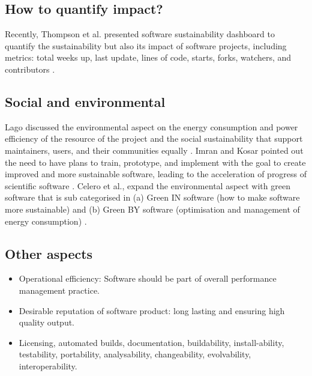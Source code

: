 \documentclass{article}
\begin{document}





\subsection{How to quantify impact?}
Recently, Thompson et al. presented software sustainability dashboard to quantify the sustainability but also its impact of software projects, including metrics: total weeks up, last update, lines of code, starts, forks, watchers, and contributors \cite{ozdemir_2023_8337480}.

\subsection{Social and environmental}
Lago discussed the environmental aspect on the energy consumption and power efficiency of the resource of the project and the social sustainability that support maintainers, users, and their communities equally
\cite{lago2019-Software-Sustainability}. 
Imran and Kosar pointed out the need to have plans to train, prototype, and implement with the goal to create improved and more sustainable software, leading to the acceleration of progress of scientific software \cite{imran2019software}.
Celero et al., expand the environmental aspect with green software that is sub categorised in (a) Green IN software (how to make software more sustainable) and (b) Green BY software (optimisation and management of energy consumption) \cite{calero2019-software-sustainability}.



\subsection{Other aspects}


\begin{itemize}
\item Operational efficiency: Software should be part of overall performance management practice. 
\item Desirable reputation of software product: long lasting and ensuring high quality output.
\item Licensing, automated builds, documentation, buildability, install-ability, testability, portability, analysability, changeability, evolvability, interoperability. 
\end{itemize}
\end{document}
